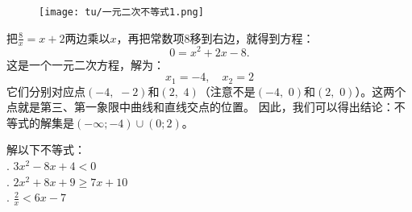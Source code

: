 \documentclass[12pt,UTF8]{ctexbook}
\begin{document}
\begin{figure}[h]
    \vspace{4pt}
    \centering
    \texttt{[image: tu/一元二次不等式1.png]}
\end{figure}

把$\frac{8}{x} = x + 2$两边乘以$x$，再把常数项$8$移到右边，就得到方程：
$$ 0 =  x^2 + 2x - 8.$$
这是一个一元二次方程，解为：
$$ x_1 = -4, \quad x_2 = 2$$
它们分别对应点$(-4, \,\,-2)$和$(2, \,\,4)$（注意不是$(-4, \,\,0)$和$(2, \,\,0)$）。这两个点就是第三、第一象限中曲线和直线交点的位置。
因此，我们可以得出结论：不等式的解集是$(-\infty; -4) \cup (0; 2)$。

\begin{xt}\label{xt:5-2-0}
    解以下不等式：\\
    . $3x^2 - 8x + 4 < 0$ \\
    . $2x^2 + 8x + 9 \geqslant 7x + 10$ \\
    . $\frac{2}{x} < 6x- 7$ 
\end{xt}
\end{document}
